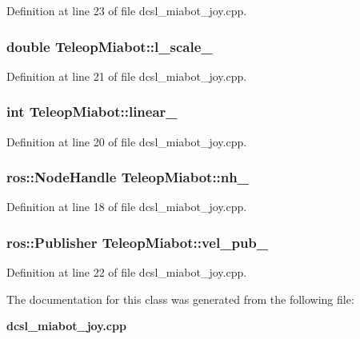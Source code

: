 \-Definition at line 23 of file dcsl\-\_\-miabot\-\_\-joy.\-cpp.

\subsubsection[{l\-\_\-scale\-\_\-}]{\setlength{\rightskip}{0pt plus 5cm}double {\bf \-Teleop\-Miabot\-::l\-\_\-scale\-\_\-}\hspace{0.3cm}{\ttfamily  [private]}}\label{classTeleopMiabot_abb2794c3238426aa421e25ca4d0b67e8}


\-Definition at line 21 of file dcsl\-\_\-miabot\-\_\-joy.\-cpp.

\subsubsection[{linear\-\_\-}]{\setlength{\rightskip}{0pt plus 5cm}int {\bf \-Teleop\-Miabot\-::linear\-\_\-}\hspace{0.3cm}{\ttfamily  [private]}}\label{classTeleopMiabot_a6d56438d8a98fde9616d7a037e3c8acb}


\-Definition at line 20 of file dcsl\-\_\-miabot\-\_\-joy.\-cpp.

\subsubsection[{nh\-\_\-}]{\setlength{\rightskip}{0pt plus 5cm}ros\-::\-Node\-Handle {\bf \-Teleop\-Miabot\-::nh\-\_\-}\hspace{0.3cm}{\ttfamily  [private]}}\label{classTeleopMiabot_ad4260ca36437e55ce6ddc61c4396f05e}


\-Definition at line 18 of file dcsl\-\_\-miabot\-\_\-joy.\-cpp.

\subsubsection[{vel\-\_\-pub\-\_\-}]{\setlength{\rightskip}{0pt plus 5cm}ros\-::\-Publisher {\bf \-Teleop\-Miabot\-::vel\-\_\-pub\-\_\-}\hspace{0.3cm}{\ttfamily  [private]}}\label{classTeleopMiabot_adb7abb9d4c221e4ca527c0aec131fd34}


\-Definition at line 22 of file dcsl\-\_\-miabot\-\_\-joy.\-cpp.



\-The documentation for this class was generated from the following file\-:\begin{DoxyCompactItemize}
\item 
{\bf dcsl\-\_\-miabot\-\_\-joy.\-cpp}\end{DoxyCompactItemize}
